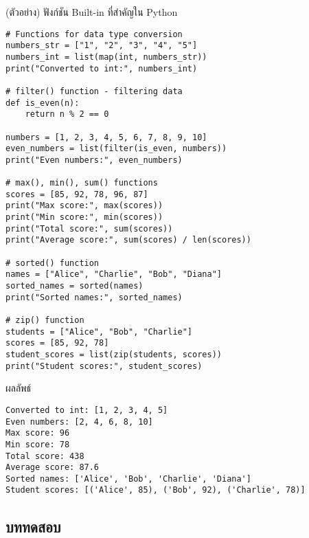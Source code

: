 \documentclass[12pt,a4paper]{article}
\begin{document}
\begin{codebox}{(ตัวอย่าง) ฟังก์ชัน Built-in ที่สำคัญใน Python}
\begin{lstlisting}[style=python]
# Functions for data type conversion
numbers_str = ["1", "2", "3", "4", "5"]
numbers_int = list(map(int, numbers_str))
print("Converted to int:", numbers_int)

# filter() function - filtering data
def is_even(n):
    return n % 2 == 0

numbers = [1, 2, 3, 4, 5, 6, 7, 8, 9, 10]
even_numbers = list(filter(is_even, numbers))
print("Even numbers:", even_numbers)

# max(), min(), sum() functions
scores = [85, 92, 78, 96, 87]
print("Max score:", max(scores))
print("Min score:", min(scores))
print("Total score:", sum(scores))
print("Average score:", sum(scores) / len(scores))

# sorted() function
names = ["Alice", "Charlie", "Bob", "Diana"]
sorted_names = sorted(names)
print("Sorted names:", sorted_names)

# zip() function
students = ["Alice", "Bob", "Charlie"]
scores = [85, 92, 78]
student_scores = list(zip(students, scores))
print("Student scores:", student_scores)
\end{lstlisting}
\end{codebox}

\begin{resultbox}{ผลลัพธ์}
\begin{verbatim}
Converted to int: [1, 2, 3, 4, 5]
Even numbers: [2, 4, 6, 8, 10]
Max score: 96
Min score: 78
Total score: 438
Average score: 87.6
Sorted names: ['Alice', 'Bob', 'Charlie', 'Diana']
Student scores: [('Alice', 85), ('Bob', 92), ('Charlie', 78)]
\end{verbatim}
\end{resultbox}

\subsection{บททดสอบ}
\end{document}
